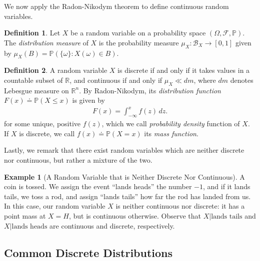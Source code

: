 \documentclass[12pt]{article}
\newcommand{\rr}{\mathbb{R}}
\newcommand{\filter}{\mathcal{F}}
\newcommand{\borel}{\mathcal{B}}
\newcommand{\prob}{\mathbb{P}}
\theoremstyle{plain}
\theoremstyle{definition}
\newtheorem*{definition}{Definition}
\newtheorem*{example}{Example}
\theoremstyle{remark}
\numberwithin{equation}{section}  %
\begin{document}
We now apply the Radon-Nikodym theorem to define continuous random variables.
\begin{definition}
    Let $X$ be a random variable on a probability space $(\Omega, \filter, \prob)$. 
    The \emph{distribution measure} of $X$ is the probability measure $\mu_X:
    \borel_X \to [0,1]$ given by $\mu_X(B) = \prob(\{\omega\}: X(\omega) \in B)$.
\end{definition}
\begin{definition}
    A random variable $X$ is discrete if and only if it takes values in a countable
    subset of $\rr$, and continuous if and only if $\mu_X \ll dm$, where $dm$
    denotes Lebesgue measure on $\rr^n$. By Radon-Nikodym, its \emph{distribution
    function} $F(x) \doteq \prob(X \le x)$ is given by
    \begin{align*}
        F(x) = \int_{-\infty}^x f(z) \,dz.
    \end{align*}
    for some unique, positive $f(z)$, which we call \emph{probability density}
    function of $X$.
    If $X$ is discrete, we call
    $f(x) \doteq \prob(X = x)$ its \emph{mass function}.
\end{definition}
Lastly, we remark that there exist random variables which are neither
discrete nor continuous, but rather a mixture of the two.
\begin{example}[A Random Variable that is Neither Discrete Nor Continuous]
    A coin is tossed. We assign the event ``lands heads'' the number $-1$, and 
    if it lands tails, we toss a rod, and assign ``lands tails'' how far the rod has
    landed from us. In this case, our random variable $X$ is neither continuous nor
    discrete: it has a point mass at $X = H$, but is continuous otherwise.
    Observe that $X | \text{lands tails}$ and $X | \text{lands heads}$ are
    continuous and discrete, respectively.
\end{example}
\subsection{Common Discrete Distributions}
\end{document}
